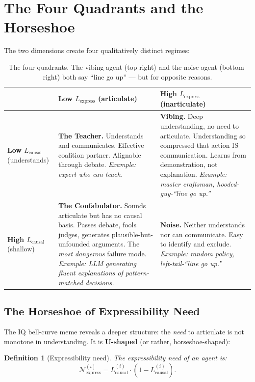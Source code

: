 \documentclass[11pt,a4paper]{article}
\newtheorem{definition}[theorem]{Definition}
\begin{document}
\section{The Four Quadrants and the Horseshoe}

The two dimensions create four qualitatively distinct regimes:

\begin{table}[h]
\centering
\renewcommand{\arraystretch}{1.4}
\begin{tabular}{p{2.5cm}|p{5.5cm}|p{5.5cm}}
& \textbf{Low $L_{\text{express}}$} (articulate) &
  \textbf{High $L_{\text{express}}$} (inarticulate) \\
\hline
\textbf{Low $L_{\text{causal}}$} (understands) &
  \textbf{The Teacher.} Understands and communicates.
  Effective coalition partner. Alignable through debate.
  \emph{Example: expert who can teach.} &
  \textbf{Vibing.} Deep understanding, no need to articulate.
  Understanding so compressed that action IS communication.
  Learns from demonstration, not explanation.
  \emph{Example: master craftsman, hooded-guy-``line go up.''} \\
\hline
\textbf{High $L_{\text{causal}}$} (shallow) &
  \textbf{The Confabulator.} Sounds articulate but has no causal
  basis. Passes debate, fools judges, generates plausible-but-unfounded
  arguments. The \emph{most dangerous} failure mode.
  \emph{Example: LLM generating fluent explanations of pattern-matched
  decisions.} &
  \textbf{Noise.} Neither understands nor can communicate.
  Easy to identify and exclude.
  \emph{Example: random policy, left-tail-``line go up.''} \\
\end{tabular}
\caption{The four quadrants. The vibing agent (top-right) and the noise agent (bottom-right) both say ``line go up'' --- but for opposite reasons.}
\label{tab:quadrants}
\end{table}


\subsection{The Horseshoe of Expressibility Need}

The IQ bell-curve meme reveals a deeper structure: the \emph{need} to
articulate is not monotone in understanding. It is \textbf{U-shaped}
(or rather, horseshoe-shaped):

\begin{definition}[Expressibility need]\label{def:express-need}
The expressibility \emph{need} of an agent is:
\begin{equation}\label{eq:horseshoe}
    \mathcal{N}_{\text{express}}^{(i)} = L_{\text{causal}}^{(i)} \cdot (1 - L_{\text{causal}}^{(i)}).
\end{equation}
\end{definition}
\end{document}
